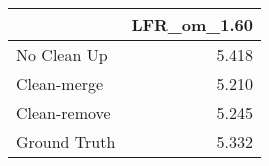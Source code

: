 \begin{tabular}{lr}
\toprule
{} & LFR_om_1.60 \\
\midrule
No Clean Up  &       5.418 \\
Clean-merge  &       5.210 \\
Clean-remove &       5.245 \\
Ground Truth &       5.332 \\
\bottomrule
\end{tabular}
